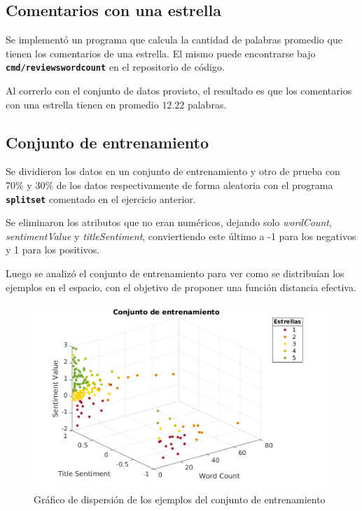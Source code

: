 \documentclass[a4paper]{article}
\newcommand{\bold}[1]{\textbf{\texttt{#1}}}
\begin{document}
\subsection{Comentarios con una estrella}
Se implementó un programa que calcula la cantidad de palabras promedio que tienen los comentarios de una estrella. El mismo puede encontrarse bajo \bold{cmd/reviewswordcount} en el repositorio de código.

Al correrlo con el conjunto de datos provisto, el resultado es que los comentarios con una estrella tienen en promedio $12.22$ palabras.

\subsection{Conjunto de entrenamiento}
Se dividieron los datos en un conjunto de entrenamiento y otro de prueba con 70\% y 30\% de los datos respectivamente de forma aleatoria con el programa \bold{splitset} comentado en el ejercicio anterior.

Se eliminaron los atributos que no eran numéricos, dejando solo \textit{wordCount}, \textit{sentimentValue} y \textit{titleSentiment}, conviertiendo este último a -1 para los negativos y 1 para los positivos.

Luego se analizó el conjunto de entrenamiento para ver como se distribuían los ejemplos en el espacio, con el objetivo de proponer una función distancia efectiva.

\begin{figure}[h]
  \centering
    \includegraphics[scale=0.5]{img/knn-training-set-scatter.png}
  \caption{Gráfico de dispersión de los ejemplos del conjunto de entrenamiento}
  \label{fig:ej3-scatter-training}
\end{figure}
\end{document}
